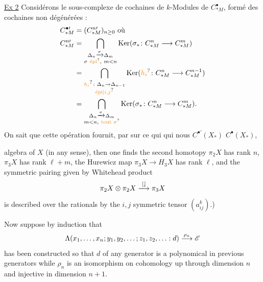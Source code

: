 \uline{Ex 2} Considérons le sous-complexe de cochaines de $k$-Modules de $C_{*M}^\bullet$, formé des cochaines non dégénérées :
\[
\begin{aligned}
 C_{*M}^{\bullet\prime}&=(C_{*M}^{n\prime})_{n\geq0}\text{ où}\\
 C_{*M}^{n\prime}&=\bigcap_{\substack{\Delta_n\xrightarrow{\sigma}\Delta_m\\ \sigma\ \unsure{\text{épi}},\ m<n}}\operatorname{Ker}(\sigma_*\colon C_{*M}^{n}\longrightarrow C_{*M}^{m})\\
 &=\bigcap_{\substack{\unsure{h_i}\colon\Delta_n\to\Delta_{n-1}\\ \unsure{\text{épi}|i,j}}}\operatorname{Ker}(\unsure{h_i}\colon C_{*M}^n\longrightarrow C_{*M}^{n-1})\\
 &=\bigcap_{\substack{\Delta_n\xrightarrow{\sigma}\Delta_m\\m<n,\ \unsure{\text{tout }\sigma}}}\operatorname{Ker}(\sigma_*\colon C_{*M}^n\longrightarrow C_{*M}^m).
\end{aligned}
\]
On sait que cette opération fournit, par  sur ce  qui   qui nous  $C^{\bullet\prime}(X_*)$  $C^\bullet(X_*)$,

algebra of $X$ (in any sense), then one finds the second homotopy  $\pi_2 X$ has rank $n$, $\pi_3 X$ has rank $\ell+m$, the Hurewicz map $\pi_3 X\to H_3 X$ has rank $\ell$, and the symmetric pairing given by Whitehead product
\[
 \pi_2 X\otimes\pi_2 X\mathrel{\overset{[,\!]}{\longrightarrow}}\pi_3 X
\]
is described over the rationals by the $i,j$ symmetric tensor $(a_{ij}^k)$.)

Now suppose by induction that
\[
 \Lambda(x_1,\ldots,x_n;y_1,y_2,\ldots;z_1,z_2,\ldots:d)
 \mathrel{\overset{\rho_n}{\longrightarrow}}\mathscr{E}
\]
has been constructed so that $d$ of any generator is a polynomical in previous generators while $\rho_n$ is an isomorphism on cohomology up through dimension $n$ and injective in dimension $n+1$.

